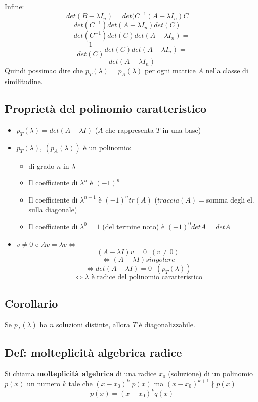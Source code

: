 Infine:
\[det(B-\lambda I_n)=det(C^{-1}(A-\lambda I_n)C=\]
\[det(C^{-1})det(A-\lambda I_n)det(C)=\]
\[det(C^{-1})det(C)det(A-\lambda I_n)=\]
\[\frac{1}{det(C)}det(C)det(A-\lambda I_n)=\]
\[det(A-\lambda I_n)\]
Quindi possimao dire che $p_T(\lambda)=p_A(\lambda)$ per ogni matrice $A$ nella classe di similitudine.

\subsection{Proprietà del polinomio caratteristico}
\begin{itemize}

\item $p_T(\lambda)=det(A-\lambda I)$ ($A$ che rappresenta $T$ in una base)

\item $p_T(\lambda)$, $(p_A(\lambda))$ è un polinomio:
  \begin{itemize}
  \item di grado $n$ in $\lambda $
  \item Il coefficiente di $\lambda ^n$ è $(-1)^n$
  \item Il coefficiente di $\lambda^{n-1}$ è $(-1)^ntr(A)$ ($traccia(A)=$somma degli el. sulla diagonale)
  \item Il coefficiente di $\lambda ^0=1$ (del termine noto) è $(-1)^0detA=detA$
  \end{itemize}

\item $v\neq 0$ e $Av=\lambda v \Leftrightarrow$
  \[(A-\lambda I)v=0\;\;(v\neq 0)\]
  \[\Leftrightarrow (A-\lambda I)singolare\]
  \[\Leftrightarrow det(A-\lambda I)=0\;\;(p_T(\lambda))\]
  \[\Leftrightarrow\lambda\text{ è radice del polinomio caratteristico}\]

\end{itemize}

\subsection{Corollario}
Se $p_T(\lambda)$ ha $n$ soluzioni distinte, allora $T$ è diagonalizzabile.

\subsection{Def: molteplicità algebrica radice}
Si chiama \textbf{molteplicità algebrica} di una radice $x_0$ (soluzione) di un polinomio $p(x)$ un numero $k$ tale che $(x-x_0)^k|p(x)$ ma $(x-x_0)^{k+1}\nmid p(x)$
  \[p(x)=(x-x_0)^kq(x)\]

